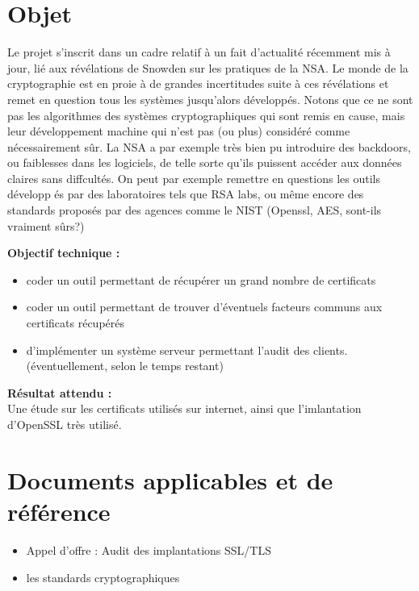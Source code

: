 \documentclass[a4paper,11pt,french]{article}
\begin{document}
\section{Objet}
Le projet s'inscrit dans un cadre relatif à un fait d'actualité récemment mis à jour, lié aux révélations de Snowden sur les pratiques de la NSA. Le monde de la cryptographie est en proie à de grandes incertitudes suite à ces révélations et remet en question tous les systèmes jusqu'alors développés. Notons que ce ne sont pas les algorithmes des systèmes cryptographiques qui sont remis en cause, mais leur développement machine qui n'est pas (ou plus) considéré comme nécessairement sûr. La NSA a par exemple très bien pu introduire des backdoors, ou faiblesses dans les logiciels, de telle sorte qu'ils puissent accéder aux données claires sans diffcultés. On peut par exemple remettre en questions les outils développ és par des laboratoires tels que RSA labs, ou même encore des standards proposés par des agences comme le NIST (Openssl, AES, sont-ils vraiment sûrs?)

\textbf{Objectif technique : }
\begin{itemize}
	\item coder un outil permettant de récupérer un grand nombre de certificats
	\item coder un outil permettant de trouver d'éventuels facteurs communs aux certificats récupérés
	\item  d'implémenter un système serveur permettant l'audit des clients. (éventuellement, selon le temps restant)
\end{itemize}

\textbf{Résultat attendu : }\\
Une étude sur les certificats utilisés sur internet, ainsi que l'imlantation d'OpenSSL très utilisé.

\section{Documents applicables et de référence}
\begin{itemize}
	\item Appel d'offre : Audit des implantations SSL/TLS
	\item les standards cryptographiques
\end{itemize}

\end{document}
